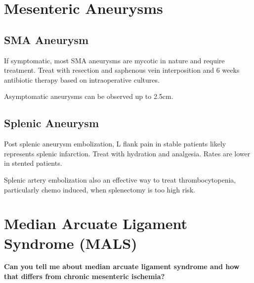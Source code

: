 \documentclass[
]{book}
\begin{document}
\hypertarget{mesenteric-aneurysms}{%
\section{Mesenteric Aneurysms}\label{mesenteric-aneurysms}}

\hypertarget{sma-aneurysm}{%
\subsection{SMA Aneurysm}\label{sma-aneurysm}}

If symptomatic, most SMA aneurysms are mycotic in nature and require
treatment. Treat with resection and saphenous vein interposition and 6
weeks antibiotic therapy based on intraoperative
cultures.\citep{leeInfectedMycoticAneurysms2008}

Asymptomatic aneurysms can be observed up to
2.5cm.\citep{kwong85SplanchnicArtery, stoneSuperiorMesentericArtery2002}

\hypertarget{splenic-aneurysm}{%
\subsection{Splenic Aneurysm}\label{splenic-aneurysm}}

Post splenic aneurysm embolization, L flank pain in stable patients
likely represents splenic infarction. Treat with hydration and
analgesia. Rates are lower in stented
patients.\citep{kwong85SplanchnicArtery, piffarettiSplenicArteryAneurysms2007, zhuEndovascularSurgicalManagement2019}

Splenic artery embolization also an effective way to treat
thrombocytopenia, particularly chemo induced, when splenectomy is too
high risk.\citep{bhatia2015}

\hypertarget{median-arcuate-ligament-syndrome-mals}{%
\section{Median Arcuate Ligament Syndrome (MALS)}\label{median-arcuate-ligament-syndrome-mals}}

\textbf{Can you tell me about median arcuate ligament syndrome and how that
differs from chronic mesenteric ischemia?}
\end{document}
